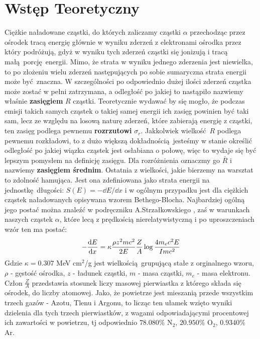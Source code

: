\documentclass[pra,
superscriptaddress,
amssymb,amsmath,amsmath,showpacs,reprint,twocolumn]{revtex4-1}
\renewcommand{\emph}{\textbf}
\begin{document}
\section{Wstęp Teoretyczny}

Ciężkie naładowane cząstki, do których zaliczamy cząstki $\alpha$ przechodząc przez ośrodek tracą energię głównie w wyniku zderzeń z elektronami ośrodka przez który podróżują, gdyż w wyniku tych zderzeń cząstki się jonizują i tracą małą porcję energii. Mimo, że strata w wyniku jednego zderzenia jest niewielka, to po złożeniu wielu zderzeń następujących po sobie sumaryczna strata energii może być znaczna. W szczególności po odpowiednio dużej ilości zderzeń cząstka może zostać w pełni zatrzymana, a odległość po jakiej to nastąpiło nazwiemy właśnie \emph{zasięgiem} $R$ cząstki.
Teoretycznie wydawać by się mogło, że podczas emisji takich samych cząstek o takiej samej energii ich zasięg powinien być taki sam, lecz ze względu na losową naturę zderzeń, które zabierają energię z cząstki, ten zasięg podlega pewnemu \emph{rozrzutowi} $\sigma_r$.
Jakkolwiek wielkość $R$ podlega pewnemu rozkładowi, to z dużo większą dokładnością jesteśmy w stanie określić odległość po jakiej wiązka cząstek jest osłabiana o połowę, więc to wydaje się być lepszym pomysłem na definicję zasięgu. Dla rozróżnienia oznaczmy go $\bar{R} $ i nazwiemy \emph{zasięgiem średnim}.
Ostatnia z wielkości, jakie bierzemy na warsztat to zdolność hamująca. Jest ona zdefiniowana jako strata energii na jednostkę długości: $S(E) = - \dd{E}/\dd{x}$ i w ogólnym przypadku jest dla ciężkich cząstek naładowanych opisywana wzorem Bethego-Blocha. Najbardziej ogólną jego postać można znaleźć w podręczniku A.Strzałkowskiego \cite{strzalkowski}, zaś w warunkach naszych cząstek $\alpha$, które lecą z prędkością nierelatywistyczną i po uproszczeniach wzór ten ma postać:
\begin{equation}\label{eq:bethe_bloch}
    -\dv{E}{x} = \kappa \frac{\rho z^2 m c^2}{2E} \frac{Z}{A} \log\frac{4 m_e c^2 E}{Imc^2}
\end{equation}
Gdzie $\kappa = 0.307$ MeV cm$^2$/g jest wielkością grupującą stałe z orginalnego wzoru, $\rho$ - gęstość ośrodka, $z$ - ładunek cząstki, $m$ - masa cząstki, $m_e$ - masa elektronu. Człon $\frac{Z}{A}$ przedstawia stosunek liczy masowej pierwiastka z którego składa się ośrodek, do liczby atomowej. Jako, że powietrze jest mieszanią przede wszystkim trzech gazów - Azotu, Tlenu i Argonu, to licząc ten ułamek wzięto wyniki dzielenia dla tych trzech pierwiastków, z wagami odpowiadającymi procentowej ich zawartości w powietrzu, tj odpowiednio $78.080\%$ N$_2$, $20.950\%$ O$_2$, $0.9340\%$ Ar.
\end{document}
